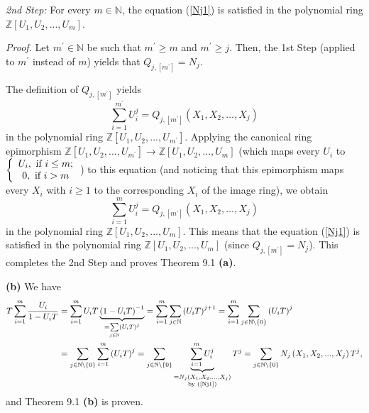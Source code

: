 \documentclass[numbers=enddot,12pt,final,onecolumn,notitlepage]{scrartcl}%
\begin{document}
\textit{2nd Step:} For every $m\in\mathbb{N}$, the equation (\ref{Nj1}) is
satisfied in the polynomial ring $\mathbb{Z}\left[  U_{1},U_{2},...,U_{m}%
\right]  $.

\textit{Proof.} Let $m^{\prime}\in\mathbb{N}$ be such that $m^{\prime}\geq m$
and $m^{\prime}\geq j$. Then, the 1st Step (applied to $m^{\prime}$ instead of
$m$) yields that $Q_{j,\left[  m^{\prime}\right]  }=N_{j}.$

The definition of $Q_{j,\left[  m^{\prime}\right]  }$ yields
\[
\sum_{i=1}^{m^{\prime}}U_{i}^{j}=Q_{j,\left[  m^{\prime}\right]  }\left(
X_{1},X_{2},...,X_{j}\right)
\]
in the polynomial ring $\mathbb{Z}\left[  U_{1},U_{2},...,U_{m^{\prime}%
}\right]  $. Applying the canonical ring epimorphism $\mathbb{Z}\left[
U_{1},U_{2},...,U_{m^{\prime}}\right]  \rightarrow\mathbb{Z}\left[
U_{1},U_{2},...,U_{m}\right]  $ (which maps every $U_{i}$ to $\left\{
\begin{array}
[c]{c}%
U_{i},\text{ if }i\leq m;\\
0,\text{ if }i>m
\end{array}
\right.  $) to this equation (and noticing that this epimorphism maps every
$X_{i}$ with $i\geq1$ to the corresponding $X_{i}$ of the image ring), we
obtain%
\[
\sum_{i=1}^{m}U_{i}^{j}=Q_{j,\left[  m^{\prime}\right]  }\left(  X_{1}%
,X_{2},...,X_{j}\right)
\]
in the polynomial ring $\mathbb{Z}\left[  U_{1},U_{2},...,U_{m}\right]  .$
This means that the equation (\ref{Nj1}) is satisfied in the polynomial ring
$\mathbb{Z}\left[  U_{1},U_{2},...,U_{m}\right]  $ (since $Q_{j,\left[
m^{\prime}\right]  }=N_{j}$). This completes the 2nd Step and proves Theorem
9.1 \textbf{(a)}.

\textbf{(b)} We have%
\begin{align*}
T\sum_{i=1}^{m}\dfrac{U_{i}}{1-U_{i}T}  &  =\sum_{i=1}^{m}U_{i}%
T\underbrace{\left(  1-U_{i}T\right)  ^{-1}}_{=\sum\limits_{j\in\mathbb{N}%
}\left(  U_{i}T\right)  ^{j}}=\sum_{i=1}^{m}\sum_{j\in\mathbb{N}}\left(
U_{i}T\right)  ^{j+1}=\sum_{i=1}^{m}\sum_{j\in\mathbb{N}\setminus\left\{
0\right\}  }\left(  U_{i}T\right)  ^{j}\\
&  =\sum_{j\in\mathbb{N}\setminus\left\{  0\right\}  }\sum_{i=1}^{m}\left(
U_{i}T\right)  ^{j}=\sum_{j\in\mathbb{N}\setminus\left\{  0\right\}
}\underbrace{\sum_{i=1}^{m}U_{i}^{j}}_{\substack{=N_{j}\left(  X_{1}%
,X_{2},...,X_{j}\right)  \\\text{by (\ref{Nj1})}}}T^{j}=\sum_{j\in
\mathbb{N}\setminus\left\{  0\right\}  }N_{j}\left(  X_{1},X_{2}%
,...,X_{j}\right)  T^{j},
\end{align*}
and Theorem 9.1 \textbf{(b)} is proven.
\end{document}

